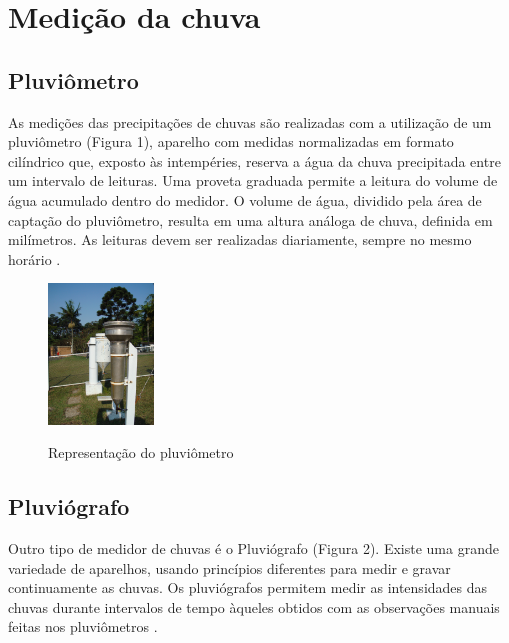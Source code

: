 \section{Medição da chuva}

\subsection{Pluviômetro}
As medições das precipitações de chuvas são realizadas com a utilização de um pluviômetro (Figura 1), aparelho com medidas normalizadas em formato cilíndrico que, exposto às intempéries, reserva a água da chuva precipitada entre um intervalo de leituras. Uma proveta graduada permite a leitura do volume de água acumulado dentro do medidor. O volume de água, dividido pela área de captação do pluviômetro, resulta em uma altura análoga de chuva, definida em milímetros. As leituras devem ser realizadas diariamente, sempre no mesmo horário \cite{manual-daee}.

\begin{figure}[H]
    \caption{Representação do pluviômetro}
    \centering
    \includegraphics[width=0.25\textwidth]{Textuais/Figuras/pluviometro.jpg}
    \label{fig:pluviometro}
\end{figure}


\subsection{Pluviógrafo}

Outro tipo de medidor de chuvas é o Pluviógrafo (Figura 2). Existe uma grande variedade de aparelhos, usando princípios diferentes para medir e gravar continuamente as chuvas. Os pluviógrafos permitem medir as intensidades das chuvas durante intervalos de tempo àqueles obtidos com as observações manuais feitas nos pluviômetros \cite{tucci1993}.

